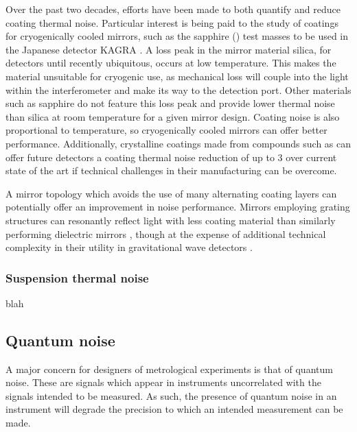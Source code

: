 Over the past two decades, efforts have been made to both quantify and reduce coating thermal noise. Particular interest is being paid to the study of coatings for cryogenically cooled mirrors, such as
the sapphire () test masses to be used in the Japanese detector \gls{KAGRA} \cite{Somiya2012}. A loss peak in the mirror material silica, for detectors until recently ubiquitous, occurs at low temperature. This makes the material unsuitable for cryogenic use, as mechanical loss will couple into the light within the interferometer and make its way to the detection port. Other materials such as sapphire do not feature this loss peak and provide lower thermal noise than silica at room temperature for a given mirror design. Coating noise is also proportional to temperature, so cryogenically cooled mirrors can offer better performance. Additionally, crystalline coatings made from compounds such as  can offer future detectors a coating thermal noise reduction of up to 3 over current state of the art \cite{Cole2013} if technical challenges in their manufacturing can be overcome.

A mirror topology which avoids the use of many alternating coating layers can potentially offer an improvement in noise performance. Mirrors employing grating structures can resonantly reflect light with less coating material than similarly performing dielectric mirrors \cite{Mashev1985}, though at the expense of additional technical complexity in their utility in gravitational wave detectors \cite{Leavey2015}.

\subsubsection{\label{sec:sus-thermal-noise}Suspension thermal noise}
blah


\subsection{Quantum noise}
A major concern for designers of metrological experiments is that of quantum noise. These are signals which appear in instruments uncorrelated with the signals intended to be measured. As such, the presence of quantum noise in an instrument will degrade the precision to which an intended measurement can be made.

